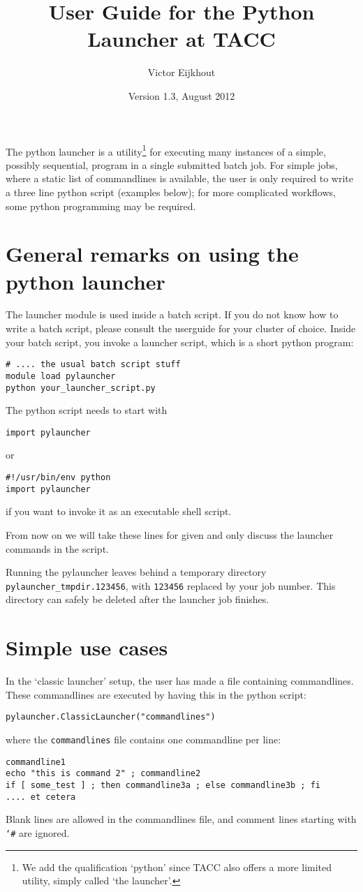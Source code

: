 \documentclass[11pt]{artikel3}
\newcommand\n[1]{{\tt #1}}
\begin{document}
\title{User Guide for the Python Launcher at TACC}
\author{Victor Eijkhout}
\date{Version 1.3, August 2012}
\maketitle

The python launcher is a utility\footnote{We add the qualification
  `python' since TACC also offers a more limited utility, simply
  called `the launcher'.} for executing many instances of a
simple, possibly sequential, program in a single submitted batch
job. For simple jobs, where a static list of commandlines is
available, the user is only required to write a three line python
script (examples below); for more complicated workflows, some python
programming may be required.

\section{General remarks on using the python launcher}

The launcher module is used inside a batch script. If you do not know
how to write a batch script, please consult the userguide for your
cluster of choice. Inside your batch script, you invoke a launcher
script, which is a short python program:
\begin{verbatim}
# .... the usual batch script stuff
module load pylauncher
python your_launcher_script.py
\end{verbatim}
The python script needs to start with
\begin{verbatim}
import pylauncher
\end{verbatim}
or 
\begin{verbatim}
#!/usr/bin/env python
import pylauncher
\end{verbatim}
if you want to invoke it as an executable shell script.

From now on we will take these lines for given and only discuss the
launcher commands in the script.

Running the pylauncher leaves behind a temporary directory {\tt
  pylauncher\_tmpdir.123456}, with {\tt 123456} replaced by your job
number. This directory can safely be deleted after the launcher job
finishes.

\section{Simple use cases}

In the `classic launcher' setup, the user has made a file containing
commandlines. These commandlines are executed by having this in the
python script:
\begin{verbatim}
pylauncher.ClassicLauncher("commandlines")
\end{verbatim}
where the \n{commandlines} file contains one commandline per line:
\begin{verbatim}
commandline1
echo "this is command 2" ; commandline2
if [ some_test ] ; then commandline3a ; else commandline3b ; fi
.... et cetera
\end{verbatim}
Blank lines are allowed in the commandlines file, and comment lines
starting with \n{\char`\#} are ignored.
\end{document}

